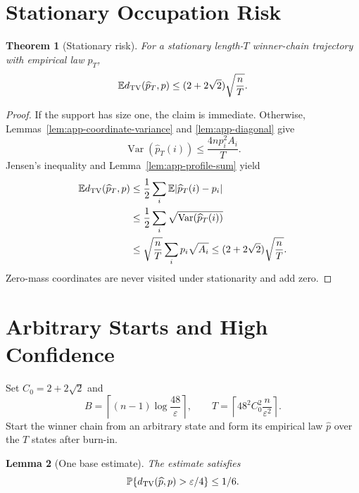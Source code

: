\documentclass{article}
\newtheorem{theorem}{Theorem}
\newtheorem{lemma}[theorem]{Lemma}
\newcommand{\E}{\mathbb E}
\newcommand{\Prb}{\mathbb P}
\newcommand{\TV}{d_{\rm TV}}
\begin{document}
\section{Stationary Occupation Risk}
\label{app:stationary}

\begin{theorem}[Stationary risk]
\label{thm:app-risk}
For a stationary length-$T$ winner-chain trajectory with empirical law
$\widehat p_T$,
\begin{equation}
 \E\TV(\widehat p_T,p)
 \le(2+2\sqrt2)\sqrt{\frac nT}.
 \label{eq:app-risk}
\end{equation}
\end{theorem}

\begin{proof}
If the support has size one, the claim is immediate. Otherwise,
Lemmas~\ref{lem:app-coordinate-variance} and \ref{lem:app-diagonal} give
\[
 \operatorname{Var}(\widehat p_T(i))
 \le\frac{4np_i^2A_i}{T}.
\]
Jensen's inequality and Lemma~\ref{lem:app-profile-sum} yield
\begin{align*}
 \E\TV(\widehat p_T,p)
 &\le\frac12\sum_i\E|\widehat p_T(i)-p_i|\\
 &\le\frac12\sum_i\sqrt{\operatorname{Var}(\widehat p_T(i))}\\
 &\le\sqrt{\frac nT}\sum_i p_i\sqrt{A_i}
 \le(2+2\sqrt2)\sqrt{\frac nT}.
\end{align*}
Zero-mass coordinates are never visited under stationarity and add zero.
\end{proof}

\section{Arbitrary Starts and High Confidence}
\label{app:amplification}

Set $C_0=2+2\sqrt2$ and
\begin{equation}
 B=\left\lceil(n-1)\log\frac{48}{\varepsilon}\right\rceil,
 \qquad
 T=\left\lceil48^2C_0^2\frac{n}{\varepsilon^2}\right\rceil.
 \label{eq:app-BT}
\end{equation}
Start the winner chain from an arbitrary state and form its empirical law
$\widehat p$ over the $T$ states after burn-in.

\begin{lemma}[One base estimate]
\label{lem:app-base}
The estimate satisfies
\begin{equation}
 \Prb\{\TV(\widehat p,p)>\varepsilon/4\}\le1/6.
 \label{eq:app-base}
\end{equation}
\end{lemma}
\end{document}
